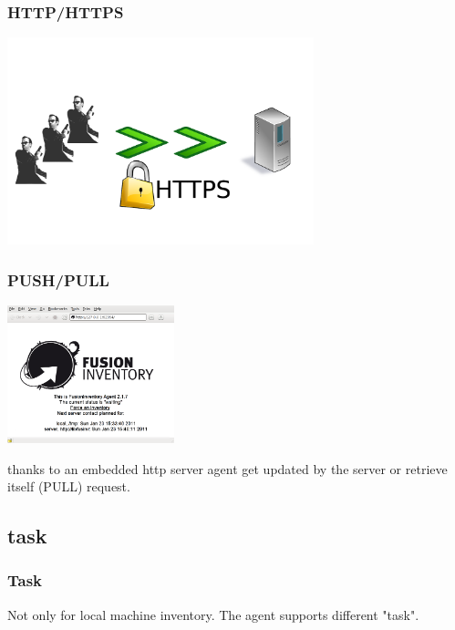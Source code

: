 \begin{frame}
\frametitle{HTTP/HTTPS}
%
\includegraphics[height=6.0cm]{pics/https.pdf}
%
\end{frame}
\begin{frame}
\frametitle{PUSH/PULL}
\includegraphics[height=4.0cm]{pics/http-server.png}

thanks to an embedded http server agent get updated by the server or retrieve itself (PULL) request.
%
\end{frame}



\subsection{task}
\begin{frame}
\frametitle{Task}
%
Not only for local machine inventory. The agent supports different "task".
\end{frame}



